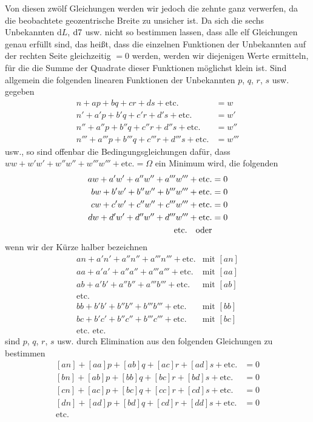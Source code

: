 Von diesen zwölf Gleichungen werden wir jedoch die zehnte ganz verwerfen, da die beobachtete geozentrische Breite zu unsicher ist.
\SourceGathering{3\textsuperscript{*}}
Da sich die sechs Unbekannten $\mathrm dL$, $\mathrm d\mathord{7}$ usw. nicht so bestimmen lassen, dass alle elf Gleichungen genau erfüllt sind, das heißt, dass die einzelnen Funktionen der Unbekannten auf der rechten Seite gleichzeitig $=0$ werden, werden wir diejenigen Werte ermitteln, für die die Summe der Quadrate dieser Funktionen möglichst klein ist. Sind allgemein die folgenden linearen Funktionen der Unbekannten $p$, $q$, $r$, $s$ usw. gegeben
\[
\begin{aligned}
n+ap+bq+cr+ds+\text{etc.}&=w\\
n'+a'p+b'q+c'r+d's+\text{etc.}&=w'\\
n''+a''p+b''q+c''r+d''s+\text{etc.}&=w''\\
n'''+a'''p+b'''q+c'''r+d'''s+\text{etc.}&=w'''
\end{aligned}
\]
usw., so sind offenbar die Bedingungsgleichungen dafür, dass $ww+w'w'+w''w''+w'''w'''+\text{etc.}=\Omega$ ein Minimum wird, die folgenden
\[
\begin{aligned}
aw+a'w'+a''w''+a'''w'''+\text{etc.}&=0\\
bw+b'w'+b''w''+b'''w'''+\text{etc.}&=0\\
cw+c'w'+c''w''+c'''w'''+\text{etc.}&=0\\
dw+d'w'+d''w''+d'''w'''+\text{etc.}&=0\\
\text{etc.\quad oder}&
\end{aligned}
\]
wenn wir der Kürze halber bezeichnen
\[
\begin{array}{ll}
an+a'n'+a''n''+a'''n'''+\text{etc.}&\text{mit }[an]\\
aa+a'a'+a''a''+a'''a'''+\text{etc.}&\text{mit }[aa]\\
ab+a'b'+a''b''+a'''b'''+\text{etc.}&\text{mit }[ab]\\
\text{etc.}&\\
bb+b'b'+b''b''+b'''b'''+\text{etc.}&\text{mit }[bb]\\
bc+b'c'+b''c''+b'''c'''+\text{etc.}&\text{mit }[bc]\\
\text{etc. etc.}&
\end{array}
\]
sind $p$, $q$, $r$, $s$ usw. durch Elimination aus den folgenden Gleichungen zu bestimmen
\[
\begin{aligned}{}
{[an]}+[aa]p+[ab]q+[ac]r+[ad]s+\text{etc.}&=0\\
{[bn]}+[ab]p+[bb]q+[bc]r+[bd]s+\text{etc.}&=0\\
{[cn]}+[ac]p+[bc]q+[cc]r+[cd]s+\text{etc.}&=0\\
{[dn]}+[ad]p+[bd]q+[cd]r+[dd]s+\text{etc.}&=0\\
\text{etc.}&
\end{aligned}
\]

